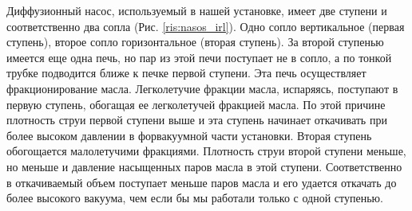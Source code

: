 \documentclass{article}
\begin{document}
    Диффузионный насос, используемый в нашей установке, имеет две ступени и соответственно два сопла (Рис. \ref{ris:nasos_irl}). Одно сопло вертикальное (первая ступень), второе сопло горизонтальное (вторая ступень). За второй ступенью имеется еще одна печь, но пар из этой печи поступает не в сопло, а по тонкой трубке подводится ближе к печке первой ступени. Эта печь осуществляет фракционирование масла. Легколетучие фракции масла, испаряясь, поступают в первую ступень, обогащая ее легколетучей фракцией масла. По этой причине плотность струи первой ступени выше и эта ступень начинает откачивать при более высоком давлении в форвакуумной части установки. Вторая ступень обогощается малолетучими фракциями. Плотность струи второй ступени меньше, но меньше и давление насыщенных паров масла в этой ступени. Соответственно в откачиваемый объем поступает меньше паров масла и его удается откачать до более высокого вакуума, чем если бы мы работали только с одной ступенью.
\end{document}
